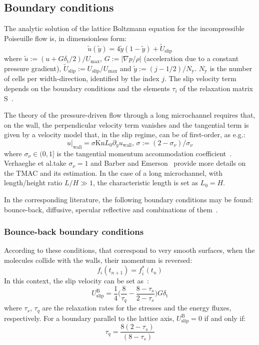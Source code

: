 \subsection{Boundary conditions}
The analytic solution of the lattice Boltzmann equation for the incompressible Poiseuille flow
is, in dimensionless form:
\begin{equation}
 \tilde{u}(\tilde{y}) = 4\tilde{y}(1-\tilde{y}) + \tilde{U}_\mathrm{slip}
\end{equation}
where $\tilde{u} := (u + G\delta_\mathrm{t} / 2) / U_\mathrm{max}$,
$G := |\nabla p / \rho|$ (acceleration due to a constant pressure gradient),
$\tilde{U}_\mathrm{slip} := U_\mathrm{slip} / U_\mathrm{max}$
and $\tilde{y} := (j-1/2)/N_\mathrm{y}$. $N_\mathrm{y}$ is the number of cells per width-direction,
identified by the index $j$. The slip velocity term depends on the boundary
conditions and the elements $\tau_i$ of the relaxation matrix $\mathrm{S}$~\cite{Verhaeghe2009}.

The theory of the pressure-driven flow through a long microchannel requires that, on the wall,
the perpendicular velocity term vanishes and the tangential term is given by a velocity model
that, in the slip regime, can be of first-order, as e.g.:
\begin{equation}
 u|_\mathrm{wall} = \sigma \mathrm{Kn} L_0 \partial_y u_\mathrm{wall} \textrm{, \ } \sigma := (2 - \sigma_\nu)/\sigma_\nu 
 \label{eq:slip_1order}
\end{equation}
where $\sigma_\nu \in (0,1]$ is the tangential momentum accommodation coefficient~\cite{Verhaeghe2009}. 
Verhaeghe et al.\@ take $\sigma_\nu = 1$ and Barber and Emerson~\cite{Barber2006} provide more details on the TMAC and its estimation. 
In the case of a long microchannel, with length/height ratio $L/H \gg 1$, the characteristic length is set as $L_0 = H$.

In the corresponding literature, the following boundary conditions may be found:
bounce-back, diffusive, specular reflective and combinations of them~\cite{Verhaeghe2009}.

\subsubsection{Bounce-back boundary conditions}
According to these conditions, that correspond to very smooth surfaces, when the molecules collide with the walls, their
momentum is reversed:
\begin{equation}
 f_i(t_{n+1}) = f_{\bar{i}}^*(t_n)
\end{equation}
In this context, the slip velocity can be set as~\cite{Verhaeghe2009}:
\begin{equation}
 U_\mathrm{slip}^\mathrm{B} = \frac{1}{4} \Big(\frac{8}{\tau_q} - \frac{8-\tau_s}{2-\tau_s} \Big) G \delta_\mathrm{t}
\end{equation}
where $\tau_s$, $\tau_q$ are the relaxation rates for the stresses and the energy fluxes, respectively.
For a boundary parallel to the lattice axis, $U_\mathrm{slip}^\mathrm{B} = 0$ if
and only if:
\begin{equation}
 \tau_q = \frac{8(2-\tau_s)}{(8-\tau_s)}
\end{equation}

